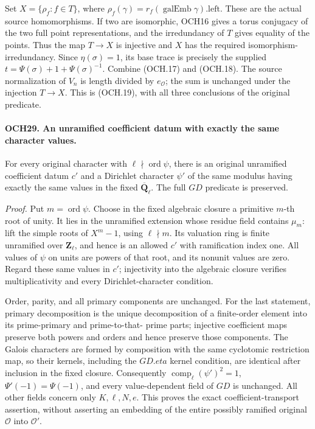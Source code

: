 \documentclass[11pt,a4paper]{article}
\numberwithin{equation}{section}
\theoremstyle{remark}\newtheorem{remark}[theorem]{Remark}
\begin{document}
Set \(X=\{\rho_f:f\in T\}\), where
\(\rho_f(\gamma)=r_f(\operatorname{galEmb}\gamma).\mathrm{left}\).
These are the actual source homomorphisms.  If two are isomorphic,
OCH16 gives a torus conjugacy of the two full point representations,
and the irredundancy of \(T\) gives equality of the points.
Thus the map \(T\to X\) is injective and \(X\) has the
required isomorphism-irredundancy.  Since \(\eta(\sigma)=1\),
its base trace is precisely the supplied
\(t=\Psi(\sigma)+1+\Psi(\sigma)^{-1}\).
Combine (OCH.17) and (OCH.18).  The source normalization of
\(V_n\) is length divided by \(e_{\mathcal O}\); the sum
is unchanged under the injection \(T\to X\).  This is
(OCH.19), with all three conclusions of the original predicate.

\paragraph{OCH29. An unramified coefficient datum with exactly the same character values.}
\label{claim:OCH29}
For every original character with \(\ell\nmid\operatorname{ord}\psi\),
there is an original unramified coefficient datum \(c'\) and a
Dirichlet character \(\psi'\) of the same modulus having
exactly the same values in the fixed
\(\overline{\mathbf Q}_\ell\).  The full \(GD\) predicate
is preserved.

\emph{Proof.}
Put \(m=\operatorname{ord}\psi\).  Choose in the fixed
algebraic closure a primitive \(m\)-th root of unity.  It lies
in the unramified extension whose residue field contains
\(\mu_m\): lift the simple roots of \(X^m-1\), using
\(\ell\nmid m\).  Its valuation ring is finite unramified
over \(\mathbf Z_\ell\), and hence is an allowed \(c'\)
with ramification index one.  All values of \(\psi\) on units
are powers of that root, and its nonunit values are zero.
Regard these same values in \(c'\); injectivity into the
algebraic closure verifies multiplicativity and every
Dirichlet-character condition.

Order, parity, and all primary components are unchanged.  For the
last statement, primary decomposition is the unique decomposition
of a finite-order element into its prime-primary and prime-to-that-
prime parts; injective coefficient maps preserve both powers and
orders and hence preserve those components.  The Galois characters
are formed by composition with the same cyclotomic restriction
map, so their kernels, including the \(GD.eta\) kernel
condition, are identical after inclusion in the fixed closure.
Consequently \(\operatorname{comp}_\ell(\psi')^2=1\),
\(\Psi'(-1)=\Psi(-1)\), and every value-dependent field of
\(GD\) is unchanged.  All other fields concern only
\(K,\ell,N,e\).  This proves the exact coefficient-transport
assertion, without asserting an embedding of the entire possibly
ramified original \(\mathcal O\) into \(\mathcal O'\).
\end{document}
